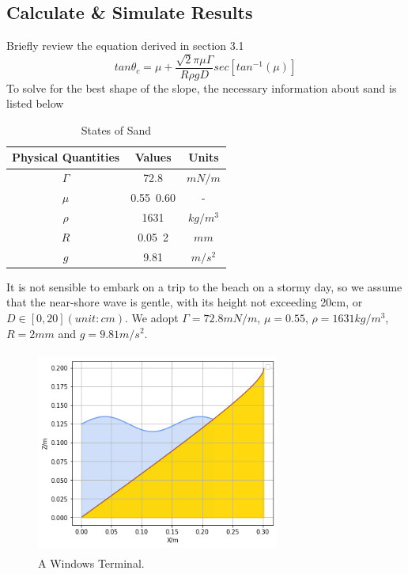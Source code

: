 \documentclass[12pt]{article}
\begin{document}
\subsection{Calculate \& Simulate Results}
Briefly review the equation derived in section 3.1
$$tan\theta_c = \mu + \frac{\sqrt{2}\pi\mu\Gamma}{R\rho gD}sec[tan^{-1}(\mu)]$$
To solve for the best shape of the slope, the necessary information about sand is listed below
\begin{table}[H]
    \caption{States of Sand}
    \vspace{10pt}
    \centering
    \begin{tabular}{ccc}
        \hline
        Physical Quantities & Values    & Units    \\
        \hline
        $\Gamma$            & 72.8      & $mN/m$   \\
        $\mu$               & 0.55~0.60 & -        \\
        $\rho$              & 1631      & $kg/m^3$ \\
        $R$                 & 0.05~2    & $mm$     \\
        $g$                 & 9.81      & $m/s^2$  \\
        \hline
    \end{tabular}
    \label{bs2}
\end{table}
\par
It is not sensible to embark on a trip to the beach on a stormy day, so we assume that the near-shore wave is gentle, with its height not exceeding 20cm, or $D \in [0, 20](unit:cm)$.
We adopt $\Gamma = 72.8mN/m$, $\mu = 0.55$, $\rho = 1631kg/m^3$, $R = 2mm$ and $g = 9.81m/s^2$.
\begin{figure}[H]
    \centering
    \includegraphics[width=8cm, height = 6.67cm]{sand5.png}
    \caption{A Windows Terminal.}
    \label{the shape of the slope}
\end{figure}
\end{document}
